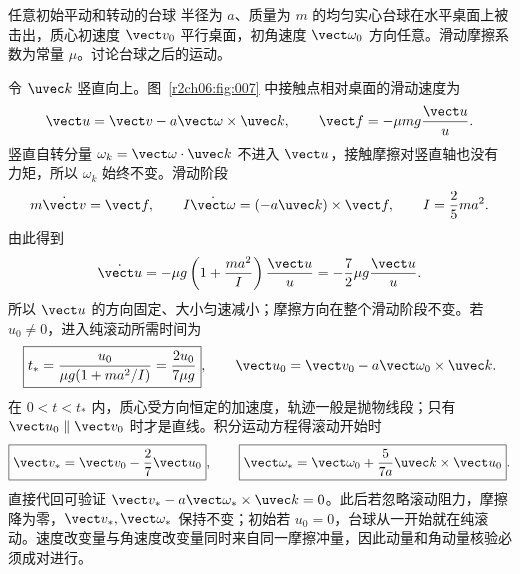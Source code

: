 \begin{practicebox}{任意初始平动和转动的台球}
半径为 $a$、质量为 $m$ 的均匀实心台球在水平桌面上被击出，质心初速度 $\vect v_0$ 平行桌面，初角速度 $\vect\omega_0$ 方向任意。滑动摩擦系数为常量 $\mu$。讨论台球之后的运动。
\label{r2ch06:pr:005}
\begin{solution}
令 $\uvec k$ 竖直向上。图~\ref{r2ch06:fig:007} 中接触点相对桌面的滑动速度为
\begin{equation}
 \vect u=\vect v-a\vect\omega\times\uvec k,\qquad
 \vect f=-\mu mg\frac{\vect u}{u}.
 \label{r2ch06:eq:033}
\end{equation}
竖直自转分量 $\omega_k=\vect\omega\cdot\uvec k$ 不进入 $\vect u$，接触摩擦对竖直轴也没有力矩，所以 $\omega_k$ 始终不变。滑动阶段
\[
 m\dot{\vect v}=\vect f,\qquad
 I\dot{\vect\omega}=(-a\uvec k)\times\vect f,\qquad
 I=\frac25ma^2.
\]
由此得到
\begin{equation}
 \dot{\vect u}=-\mu g\left(1+\frac{ma^2}{I}\right)\frac{\vect u}{u}
 =-\frac72\mu g\frac{\vect u}{u}.
 \label{r2ch06:eq:034}
\end{equation}
所以 $\vect u$ 的方向固定、大小匀速减小；摩擦方向在整个滑动阶段不变。若 $u_0\ne0$，进入纯滚动所需时间为
\begin{equation}
 \boxed{t_* =\frac{u_0}{\mu g(1+ma^2/I)}
 =\frac{2u_0}{7\mu g}},\qquad
 \vect u_0=\vect v_0-a\vect\omega_0\times\uvec k.
 \label{r2ch06:eq:035}
\end{equation}
在 $0<t<t_*$ 内，质心受方向恒定的加速度，轨迹一般是抛物线段；只有 $\vect u_0\parallel\vect v_0$ 时才是直线。积分运动方程得滚动开始时
\begin{equation}
 \boxed{\vect v_* =\vect v_0-\frac27\vect u_0},
 \qquad
 \boxed{\vect\omega_* =\vect\omega_0
 +\frac{5}{7a}\uvec k\times\vect u_0}.
 \label{r2ch06:eq:036}
\end{equation}
直接代回可验证 $\vect v_*-a\vect\omega_*\times\uvec k=0$。此后若忽略滚动阻力，摩擦降为零，$\vect v_*,\vect\omega_*$ 保持不变；初始若 $u_0=0$，台球从一开始就在纯滚动。速度改变量与角速度改变量同时来自同一摩擦冲量，因此动量和角动量核验必须成对进行。
\figBilliardSlip
\end{solution}
\end{practicebox}

